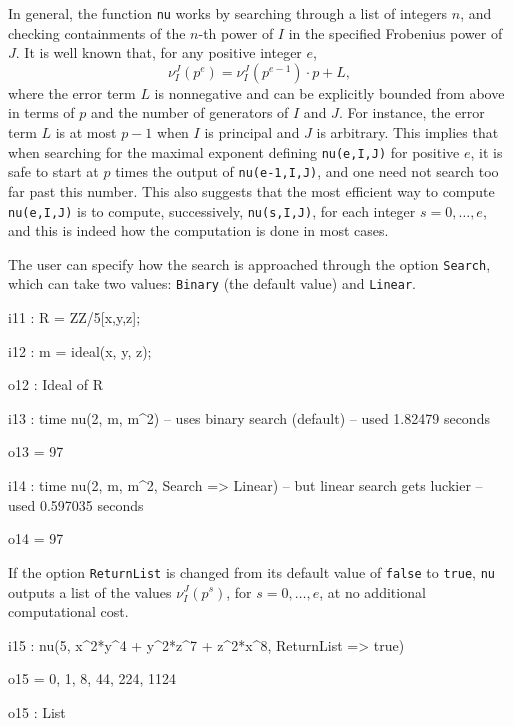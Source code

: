 \documentclass{amsart}
\begin{document}
In general, the function \texttt{nu} works by searching through a list of integers $n$, and checking containments of the $n$-th power of $I$ in the specified Frobenius power of $J$.
It is well known that, for any positive integer $e$,
\[ \nu_I^J(p^e) = \nu_I^J(p^{e-1})\cdot p + L,\]
where the error term $L$ is nonnegative and can be explicitly bounded from above in terms of $p$ and the number of generators of $I$ and $J$.
For instance, the error term $L$ is at most $p-1$ when $I$ is principal and $J$ is arbitrary.
This implies that when searching for the maximal exponent defining \texttt{nu(e,I,J)} for positive $e$, it is safe to start at $p$ times the output of \texttt{nu(e-1,I,J)}, and one need not search too far past this number.
This also suggests that the most efficient way to compute \texttt{nu(e,I,J)} is to compute, successively, \texttt{nu(s,I,J)}, for each integer $s = 0,\ldots,e$, and this is indeed how the computation is done in most cases.

The user can specify how the search is approached through the option \texttt{Search}, which can take two values: 
 \texttt{Binary} (the default value) and \texttt{Linear}.

\smallskip
{\small
{}
\begin{MyVerbatim}
i11 : R = ZZ/5[x,y,z];

i12 : m = ideal(x, y, z);

o12 : Ideal of R

i13 : time nu(2, m, m^2) -- uses binary search (default)
     -- used 1.82479 seconds

o13 = 97

i14 : time nu(2, m, m^2, Search => Linear) -- but linear search gets luckier
     -- used 0.597035 seconds

o14 = 97
\end{MyVerbatim}
}
\smallskip

If the option \texttt{ReturnList} is changed from its default value of \texttt{false} to \texttt{true}, \texttt{nu} outputs a list of the values $\nu_I^J(p^s)$, for $s=0,\ldots,e$, at no additional computational cost.

\smallskip
{\small
{}
\begin{MyVerbatim}
i15 : nu(5, x^2*y^4 + y^2*z^7 + z^2*x^8, ReturnList => true)

o15 = {0, 1, 8, 44, 224, 1124}

o15 : List
\end{MyVerbatim}
}
\smallskip
\end{document}
